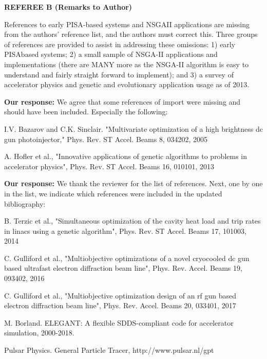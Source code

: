 \documentclass{article}
\begin{document}
{\bf REFEREE B (Remarks to Author)}

References to early PISA-based systems and NSGAII applications
are missing from the authors’ reference list, and the authors must
correct this. Three groups of references are provided to assist in
addressing these omissions: 1) early PISAbased systems; 2) a small
sample of NSGA-II applications and implementations (there are MANY
more as the NSGA-II algorithm is easy to understand and fairly
straight forward to implement); and 3) a survey of accelerator physics
and genetic and evolutionary application usage as of 2013.

{\bf Our response:} {\color{blue} We agree that some references of import were missing and should have been included.
	Especially the following: }
	
	I.V. Bazarov and C.K. Sinclair. "Multivariate optimization of a high
	brightness dc gun photoinjector," Phys. Rev. ST Accel. Beams 8,
	034202, 2005
	
	A. Hofler et al., "Innovative applications of genetic algorithms to
	problems in accelerator physics", Phys. Rev. ST Accel. Beams 16,
	010101, 2013
	
{\bf Our response:} {\color{blue} 	We thank the reviewer for the list of references. 
	Next, one by one in the list, we indicate which references were included in the updated bibliography: 
}


{\color{blue}{Included in updated bibliography (in addition to two references above):}}

B. Terzic et al., "Simultaneous optimization of the cavity heat load
and trip rates in linacs using a genetic algorithm", Phys. Rev. ST
Accel. Beams 17, 101003, 2014

C. Gulliford et al., "Multiobjective optimizations of a novel
cryocooled dc gun based ultrafast electron diffraction beam line",
Phys. Rev. Accel. Beams 19, 093402, 2016

C. Gulliford et al., "Multiobjective optimization design of an rf gun
based electron diffraction beam line", Phys. Rev. Accel. Beams 20,
033401, 2017

M. Borland. ELEGANT: A flexible SDDS-compliant code for accelerator simulation, 2000-2018.
{\color{blue}{(slightly updated this reference)}}

Pulsar Physics. General Particle Tracer, http://www.pulsar.nl/gpt

{\color{blue}{Exluded from updated bibliography, because they are in A. Hofler 13':}}
\end{document}
